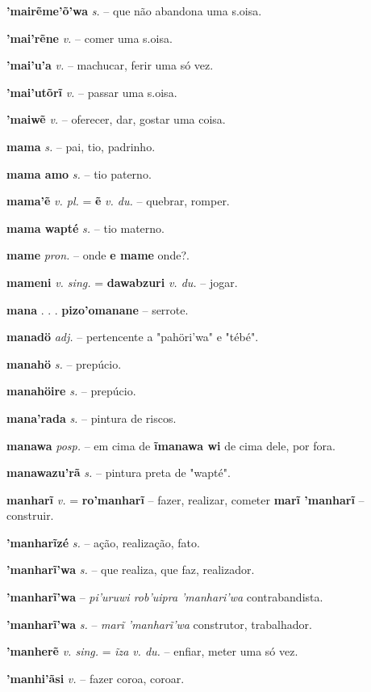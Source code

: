 \textbf{'mairẽme'õ'wa} \textit{s.} -- que não abandona uma s.oisa.

\textbf{'mai'rẽne} \textit{v.} -- comer uma s.oisa.

\textbf{'mai'u'a} \textit{v.} -- machucar, ferir uma só vez.

\textbf{'mai'utõrĩ} \textit{v.} -- passar uma s.oisa.

\textbf{'maiwẽ} \textit{v.} -- oferecer, dar, gostar uma coisa.

\textbf{mama} \textit{s.} -- pai, tio, padrinho.

\textbf{mama amo} \textit{s.} -- tio paterno.

\textbf{mama'ẽ} \textit{v. pl.} = \textbf{ẽ} \textit{v. du.} -- quebrar, romper.

\textbf{mama wapté} \textit{s.} -- tio materno.

\textbf{mame} \textit{pron.} -- onde  \textbf{e mame} onde?.

\textbf{mameni} \textit{v. sing.} = \textbf{dawabzuri} \textit{v. du.} -- jogar.

\textbf{mana} . . .  \textbf{pizo'omanane} -- serrote.

\textbf{manadö} \textit{adj.} -- pertencente a "pahöri'wa" e "tébé".

\textbf{manahö} \textit{s.} -- prepúcio.

\textbf{manahöire} \textit{s.} -- prepúcio.

\textbf{mana'rada} \textit{s.} -- pintura de riscos.

\textbf{manawa} \textit{posp.} -- em cima de  \textbf{ĩmanawa wi} de cima dele, por fora.

\textbf{manawazu'rã} \textit{s.} -- pintura preta de "wapté".

\textbf{manharĩ} \textit{v.} = \textbf{ro'manharĩ} -- fazer, realizar, cometer  \textbf{marĩ 'manharĩ} -- construir.

\textbf{'manharĩzé} \textit{s.} -- ação, realização, fato.

\textbf{'manharĩ'wa} \textit{s.} -- que realiza, que faz, realizador.

\textbf{'manharĩ'wa} -- \textit{pi'uruwi rob'uipra 'manhari'wa} contrabandista.

\textbf{'manharĩ'wa} \textit{s.} -- \textit{marĩ 'manharĩ'wa} construtor, trabalhador.

\textbf{'manherẽ} \textit{v. sing.} = \textit{ĩza} \textit{v. du.} -- enfiar, meter uma só vez.

\textbf{'manhi'ãsi} \textit{v.} -- fazer coroa, coroar.

